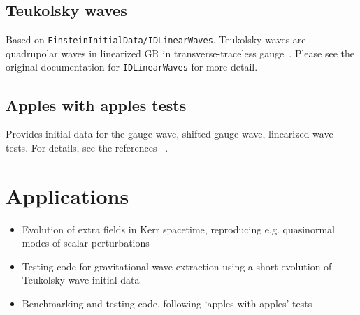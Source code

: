 \subsection{Teukolsky waves}
  Based on \texttt{EinsteinInitialData/IDLinearWaves}.
  Teukolsky waves are quadrupolar waves in linearized GR in transverse-traceless gauge~\cite{Teukolsky:1982nz}.
  Please see the original documentation for \texttt{IDLinearWaves} for more detail.

\subsection{Apples with apples tests}
Provides initial data for the gauge wave, shifted gauge wave, linearized wave tests. For details, see the references~\cite{Alcubierre:2003pc} \cite{Babiuc:2007vr} \cite{Daverio:2018tjf}.


\section{Applications}
\begin{itemize}
  \item Evolution of extra fields in Kerr spacetime, reproducing e.g. quasinormal modes of scalar perturbations

  \item Testing code for gravitational wave extraction using a short evolution of Teukolsky wave initial data

  \item Benchmarking and testing code, following `apples with apples' tests
\end{itemize}




